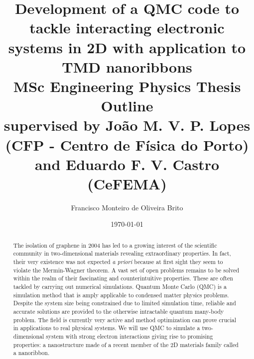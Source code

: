 \documentclass[10pt, twocolumn, twoside]{article}
\author{Francisco Monteiro de Oliveira Brito \footnotemark}
\title{Development of a QMC code to tackle interacting electronic systems in 2D with application to TMD nanoribbons  \\ \bigskip  \small{MSc Engineering Physics Thesis Outline\\ \medskip supervised by Jo\~ao M. V. P. Lopes (CFP - Centro de F\'isica do Porto) and Eduardo F. V. Castro (CeFEMA)} }
\date{\today}
\newenvironment{alphafootnotes}
  {\par\edef\savedfootnotenumber{\number\value{footnote}}
   \renewcommand{\thefootnote}{\alph{footnote}}
   \setcounter{footnote}{0}}
  {\par\setcounter{footnote}{\savedfootnotenumber}}
\begin{document}
\begin{alphafootnotes}
\end{alphafootnotes}


\begin{strip}
  \vspace*{\dimexpr-\baselineskip-\stripsep\relax}
  \centering
  \maketitle
  \vskip\baselineskip
\noindent\makebox[\textwidth]{\rule{1.1\paperwidth}{0.4pt}}
  \vskip\baselineskip
\end{strip}

\begin{abstract}
The isolation of graphene in 2004 has led to a growing interest of the scientific community in two-dimensional materials revealing extraordinary properties.  In fact, their very existence was not expected \emph{a priori} because at first sight they seem to violate the Mermin-Wagner theorem. A vast set of open problems remains to be solved within the realm of their fascinating and counterintuitive properties. These are often tackled by carrying out numerical simulations. Quantum Monte Carlo (QMC) is a simulation method that is amply applicable to condensed matter physics problems. Despite the system size being constrained due to limited simulation time, reliable and accurate solutions are provided to the otherwise intractable quantum many-body problem. The field is currently very active and method optimization can prove crucial in applications to real physical systems. We will use QMC to simulate a two-dimensional system with strong electron interactions giving rise to promising properties: a nanostructure made of a recent member of the 2D materials family called a nanoribbon.
\end{abstract}
\end{document}

